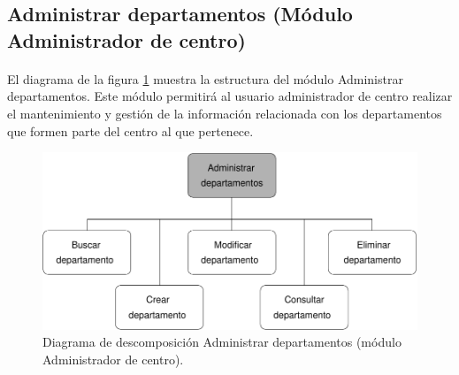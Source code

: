 \subsection{Administrar departamentos (Módulo Administrador de centro)}

  \paragraph{}El diagrama de la figura
  \ref{diagramaDescomposicionAdministrarDepartamentos-admCentro} muestra la
  estructura del módulo Administrar departamentos. Este módulo permitirá al
  usuario administrador de centro realizar el mantenimiento y gestión de la
  información relacionada con los departamentos que formen parte del centro al
  que pertenece.

  \begin{figure}[!ht]
    \begin{center}
      \includegraphics[]{11.Disenyo_Arquitectonico/11.2.Diagramas_Descomposicion/11.2.3.Modulo_administrador_centro/AdministrarBBDD/AdministrarDepartamentos/Diagramas/administrar_departamentos.pdf}
      \caption{Diagrama de descomposición Administrar departamentos (módulo Administrador de centro).}
      \label{diagramaDescomposicionAdministrarDepartamentos-admCentro}
    \end{center}
  \end{figure}

